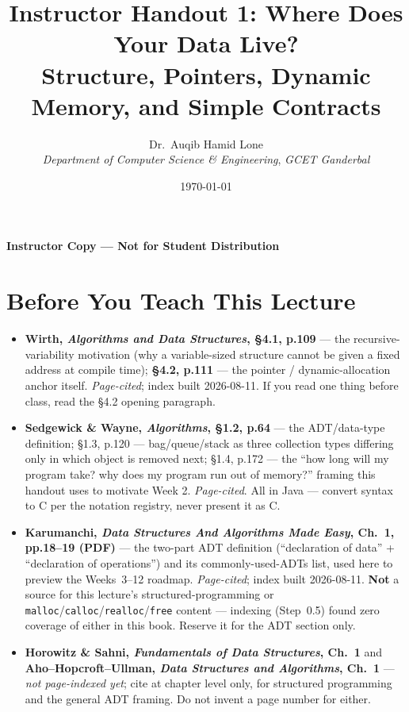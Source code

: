 \documentclass[11pt]{article}
\title{Instructor Handout 1: Where Does Your Data Live?\\\large Structure, Pointers, Dynamic Memory, and Simple Contracts}
\author{Dr.\ Auqib Hamid Lone\\[0.3em]
  \emph{Department of Computer Science \& Engineering}, \emph{GCET Ganderbal}}
\date{\today}
\begin{document}
\maketitle
{\centering\large\color{negative}\textbf{Instructor Copy --- Not for Student Distribution}\par}
\vspace{0.5cm}

\section{Before You Teach This Lecture}

\begingroup\sloppy
\begin{itemize}
  \item \textbf{Wirth, \textit{Algorithms and Data Structures}, \S4.1, p.109} --- the recursive-variability motivation (why a variable-sized structure cannot be given a fixed address at compile time); \textbf{\S4.2, p.111} --- the pointer / dynamic-allocation anchor itself. \emph{Page-cited}; index built 2026-08-11. If you read one thing before class, read the \S4.2 opening paragraph.
  \item \textbf{Sedgewick \& Wayne, \textit{Algorithms}, \S1.2, p.64} --- the ADT/data-type definition; \S1.3, p.120 --- bag/queue/stack as three collection types differing only in which object is removed next; \S1.4, p.172 --- the ``how long will my program take? why does my program run out of memory?'' framing this handout uses to motivate Week 2. \emph{Page-cited}. All in Java --- convert syntax to C per the notation registry, never present it as C.
  \item \textbf{Karumanchi, \textit{Data Structures And Algorithms Made Easy}, Ch.~1, pp.18--19 (PDF)} --- the two-part ADT definition (``declaration of data'' + ``declaration of operations'') and its commonly-used-ADTs list, used here to preview the Weeks~3--12 roadmap. \emph{Page-cited}; index built 2026-08-11. \textbf{Not} a source for this lecture's structured-programming or \texttt{malloc}/\texttt{calloc}/\texttt{realloc}/\texttt{free} content --- indexing (Step~0.5) found zero coverage of either in this book. Reserve it for the ADT section only.
  \item \textbf{Horowitz \& Sahni, \textit{Fundamentals of Data Structures}, Ch.~1} and \textbf{Aho--Hopcroft--Ullman, \textit{Data Structures and Algorithms}, Ch.~1} --- \emph{not page-indexed yet}; cite at chapter level only, for structured programming and the general ADT framing. Do not invent a page number for either.

\end{itemize}
\end{document}
